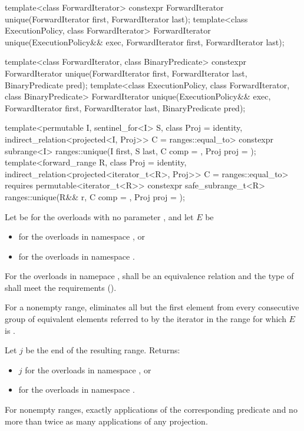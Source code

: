%
\begin{itemdecl}
template<class ForwardIterator>
  constexpr ForwardIterator unique(ForwardIterator first, ForwardIterator last);
template<class ExecutionPolicy, class ForwardIterator>
  ForwardIterator unique(ExecutionPolicy&& exec,
                         ForwardIterator first, ForwardIterator last);

template<class ForwardIterator, class BinaryPredicate>
  constexpr ForwardIterator unique(ForwardIterator first, ForwardIterator last,
                                   BinaryPredicate pred);
template<class ExecutionPolicy, class ForwardIterator, class BinaryPredicate>
  ForwardIterator unique(ExecutionPolicy&& exec,
                         ForwardIterator first, ForwardIterator last,
                         BinaryPredicate pred);

template<permutable I, sentinel_for<I> S, class Proj = identity,
         indirect_relation<projected<I, Proj>> C = ranges::equal_to>
  constexpr subrange<I> ranges::unique(I first, S last, C comp = {}, Proj proj = {});
template<forward_range R, class Proj = identity,
         indirect_relation<projected<iterator_t<R>, Proj>> C = ranges::equal_to>
  requires permutable<iterator_t<R>>
  constexpr safe_subrange_t<R>
    ranges::unique(R&& r, C comp = {}, Proj proj = {});
\end{itemdecl}

\begin{itemdescr}
\pnum
Let  be 
for the overloads with no parameter , and
let $E$ be
\begin{itemize}
\setlength{\emergencystretch}{1em}
\item
  for the overloads in namespace , or
\item
  for the overloads in namespace .
\end{itemize}

\pnum
\requires
For the overloads in namepace ,
 shall be an equivalence relation and
the type of  shall meet
the  requirements ().

\pnum
\effects
For a nonempty range, eliminates all but the first element
from every consecutive group of equivalent elements referred to
by the iterator  in the range 
for which $E$ is .

\pnum
\returns
Let $j$ be the end of the resulting range. Returns:
\begin{itemize}
\item $j$ for the overloads in namespace , or
\item {} for the overloads in namespace .
\end{itemize}

\pnum
\complexity
For nonempty ranges, exactly  applications
of the corresponding predicate and
no more than twice as many applications of any projection.
\end{itemdescr}

